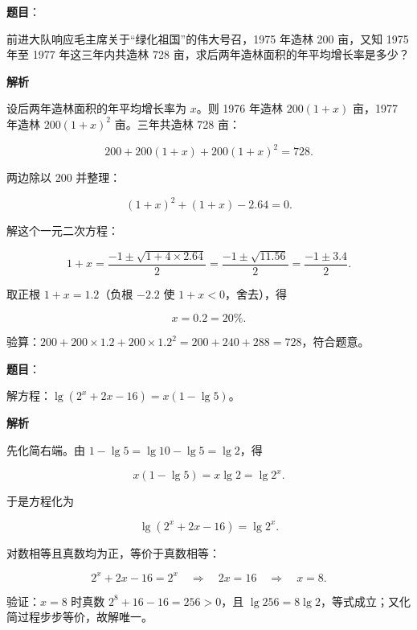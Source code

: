 \begin{answer}

\textbf{题目}：

前进大队响应毛主席关于“绿化祖国”的伟大号召，1975 年造林 200 亩，又知 1975 年至 1977 年这三年内共造林 728 亩，求后两年造林面积的年平均增长率是多少？

\textbf{解析}

设后两年造林面积的年平均增长率为 $x$。则 1976 年造林 $200(1+x)$ 亩，1977 年造林 $200(1+x)^2$ 亩。三年共造林 728 亩：

\nopagebreak[4]
\[
200+200(1+x)+200(1+x)^2=728.
\]

两边除以 200 并整理：

\nopagebreak[4]
\[
(1+x)^2+(1+x)-2.64=0.
\]

解这个一元二次方程：

\nopagebreak[4]
\[
1+x=\frac{-1\pm\sqrt{1+4\times2.64}}{2}
=\frac{-1\pm\sqrt{11.56}}{2}
=\frac{-1\pm3.4}{2}.
\]

取正根 $1+x=1.2$（负根 $-2.2$ 使 $1+x<0$，舍去），得

\nopagebreak[4]
\[
x=0.2=20\%.
\]

验算：$200+200\times1.2+200\times1.2^2=200+240+288=728$，符合题意。


\end{answer}
\begin{answer}

\textbf{题目}：

解方程：$\lg(2^x+2x-16)=x(1-\lg5)$。

\textbf{解析}

先化简右端。由 $1-\lg5=\lg10-\lg5=\lg2$，得

\nopagebreak[4]
\[
x(1-\lg5)=x\lg2=\lg2^x.
\]

于是方程化为

\nopagebreak[4]
\[
\lg(2^x+2x-16)=\lg2^x.
\]

对数相等且真数均为正，等价于真数相等：

\nopagebreak[4]
\[
2^x+2x-16=2^x
\quad\Longrightarrow\quad
2x=16
\quad\Longrightarrow\quad
x=8.
\]

验证：$x=8$ 时真数 $2^8+16-16=256>0$，且 $\lg256=8\lg2$，等式成立；又化简过程步步等价，故解唯一。


\end{answer}
